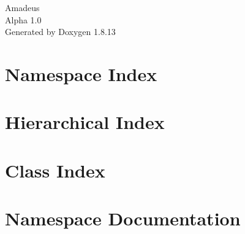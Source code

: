 \documentclass[twoside]{book}
\newcommand{\+}{\discretionary{\mbox{\scriptsize$\hookleftarrow$}}{}{}}
\newcommand{\clearemptydoublepage}{%
  \newpage{\pagestyle{empty}\cleardoublepage}%
}
\begin{document}
\hypersetup{pageanchor=false,
             bookmarksnumbered=true,
             pdfencoding=unicode
            }
\begin{titlepage}
\vspace*{7cm}
\begin{center}%
{\Large Amadeus \\[1ex]\large Alpha 1.\+0 }\\
\vspace*{1cm}
{\large Generated by Doxygen 1.8.13}\\
\end{center}
\end{titlepage}
\clearemptydoublepage
{}
\tableofcontents
\clearemptydoublepage
{}
\hypersetup{pageanchor=true}

\chapter{Namespace Index}

\chapter{Hierarchical Index}

\chapter{Class Index}

\chapter{Namespace Documentation}

\end{document}
